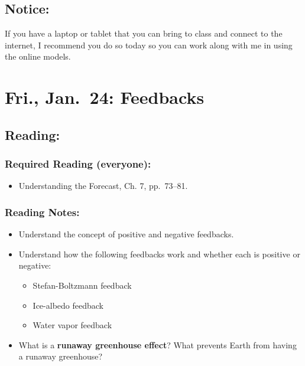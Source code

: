 \documentclass[
]{article}
\providecommand{\tightlist}{%
  \setlength{\itemsep}{0pt}\setlength{\parskip}{0pt}}
\begin{document}
\hypertarget{notice-3}{%
\subsection{Notice:}\label{notice-3}}

If you have a laptop or tablet that you can bring to class and connect
to the internet, I recommend you do so today so you can work along with
me in using the online models.

\hypertarget{fri.-jan.-24-feedbacks}{%
\section{Fri., Jan.~24: Feedbacks}\label{fri.-jan.-24-feedbacks}}

\hypertarget{reading-7}{%
\subsection{Reading:}\label{reading-7}}

\hypertarget{required-reading-everyone-5}{%
\subsubsection{Required Reading
(everyone):}\label{required-reading-everyone-5}}

\begin{itemize}
\tightlist
\item
  Understanding the Forecast, Ch. 7, pp.~73--81.
\end{itemize}

\hypertarget{reading-notes-5}{%
\subsubsection{Reading Notes:}\label{reading-notes-5}}

\begin{itemize}
\item
  Understand the concept of positive and negative feedbacks.
\item
  Understand how the following feedbacks work and whether each is
  positive or negative:

  \begin{itemize}
  \tightlist
  \item
    Stefan-Boltzmann feedback
  \item
    Ice-albedo feedback
  \item
    Water vapor feedback
  \end{itemize}
\item
  What is a \textbf{runaway greenhouse effect}? What prevents Earth from
  having a runaway greenhouse?
\end{itemize}
\end{document}
